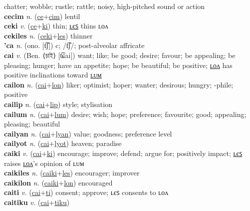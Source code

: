 chatter; wobble; rustle; rattle; noisy, high-pitched sound or action \label{cecelon} \\
\textbf{cecim} \textit{n.} (\hyperref[ce]{ce}+\hyperref[cim]{cim})
lentil \label{cecim} \\
\textbf{ceki} \textit{v.} (\hyperref[ce]{ce}+\hyperref[ki]{ki})
thin; \hyperref[cekiles]{ʟєꜱ} thins ʟᴏᴧ \label{ceki} \\
\textbf{cekiles} \textit{n.} (\hyperref[ceki]{ceki}+\hyperref[les]{les})
thinner \label{cekiles} \\
\textbf{'ca} \textit{n.} (ono. [t͡ʃ])
c; /t͡ʃ/; post-alveolar affricate \label{'ca} \\
\textbf{cai} \textit{v.} (Ben. ⟨চাই⟩ [t͡ɕai])
want; like; be good; desire; favour; be appealing; be pleasing; hunger; have an appetite; hope; be beautiful; be positive; \hyperref[cailon]{ʟᴏᴧ} has positive inclinations toward \hyperref[cailum]{ʟᴜᴍ} \label{cai} \\
\textbf{cailon} \textit{n.} (\hyperref[cai]{cai}+\hyperref[lon]{lon})
liker; optimist; hoper; wanter; desirous; hungry; -phile; positive \label{cailon} \\
\textbf{cailip} \textit{n.} (\hyperref[cai]{cai}+\hyperref[lip]{lip})
style; stylisation \label{cailip} \\
\textbf{cailum} \textit{n.} (\hyperref[cai]{cai}+\hyperref[lum]{lum})
desire; wish; hope; preference; favourite; good; appealing; pleasing; beautiful \label{cailum} \\
\textbf{cailyan} \textit{n.} (\hyperref[cai]{cai}+\hyperref[lyan]{lyan})
value; goodness; preference level \label{cailyan} \\
\textbf{cailyot} \textit{n.} (\hyperref[cai]{cai}+\hyperref[lyot]{lyot})
heaven; paradise \label{cailyot} \\
\textbf{caiki} \textit{v.} (\hyperref[cai]{cai}+\hyperref[ki]{ki})
encourage; improve; defend; argue for; positively impact; \hyperref[caikiles]{ʟєꜱ} raises \hyperref[caikilon]{ʟᴏᴧ}'s opinion of ʟᴜᴍ \label{caiki} \\
\textbf{caikiles} \textit{n.} (\hyperref[caiki]{caiki}+\hyperref[les]{les})
encourager; improver \label{caikiles} \\
\textbf{caikilon} \textit{n.} (\hyperref[caiki]{caiki}+\hyperref[lon]{lon})
encouraged \label{caikilon} \\
\textbf{caiti} \textit{v.} (\hyperref[cai]{cai}+\hyperref[ti]{ti})
consent; approve; ʟєꜱ consents to ʟᴏᴧ \label{caiti} \\
\textbf{caitiku} \textit{v.} (\hyperref[cai]{cai}+\hyperref[tiku]{tiku})
